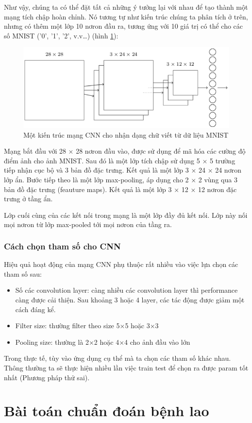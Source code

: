 Như vậy, chúng ta có thể đặt tất cả những ý tưởng lại với nhau để tạo thành một mạng tích chập hoàn chỉnh. Nó tương tự như kiến trúc chúng ta phân tích ở trên, nhưng có thêm một lớp 10 nơron đầu ra, tương ứng với 10 giá trị có thể cho các số MNIST ('0', '1', '2', v.v…) (hình \ref{fig:cnnnhandangchuviet}):
\begin{figure}[H]
	\centering
	\includegraphics[width=1\linewidth]{images/cnnnhandangchuviet.png}
	\caption{Một kiến trúc mạng CNN cho nhận dạng chữ viết từ dữ liệu MNIST}
	\label{fig:cnnnhandangchuviet}
\end{figure}
Mạng bắt đầu với 28 × 28 nơron đầu vào, được sử dụng để mã hóa các cường độ điểm ảnh cho ảnh MNIST. Sau đó là một lớp tích chập sử dụng 5 × 5 trường tiếp nhận cục bộ và 3 bản đồ đặc trưng. Kết quả là một lớp 3 × 24 × 24 nơron lớp ẩn. Bước tiếp theo là một lớp max-pooling, áp dụng cho 2 × 2 vùng qua 3 bản đồ đặc trưng (feauture maps). Kết quả là một lớp 3 × 12 × 12 nơron đặc trưng ở tầng ẩn.

Lớp cuối cùng của các kết nối trong mạng là một lớp đầy đủ kết nối. Lớp này nối mọi nơron từ lớp max-pooled tới mọi nơron của tầng ra.

\subsubsection{Cách chọn tham số cho CNN}
Hiệu quả hoạt động của mạng CNN phụ thuộc rất nhiều vào việc lựa chọn các tham số sau:

\begin{itemize}
	\item Số các convolution layer: càng nhiều các convolution layer thì performance càng được cải thiện. Sau khoảng 3 hoặc 4 layer, các tác động được giảm một cách đáng kể.
	\item Filter size: thường filter theo size 5×5 hoặc 3×3
	\item Pooling size: thường là 2×2 hoặc 4×4 cho ảnh đầu vào lớn
\end{itemize}

Trong thực tế, tùy vào ứng dụng cụ thể mà ta chọn các tham số khác nhau. Thông thường ta sẽ thực hiện nhiều lần việc train test để chọn ra được param tốt nhất (Phương pháp thử sai).

\section{Bài toán chuẩn đoán bệnh lao}